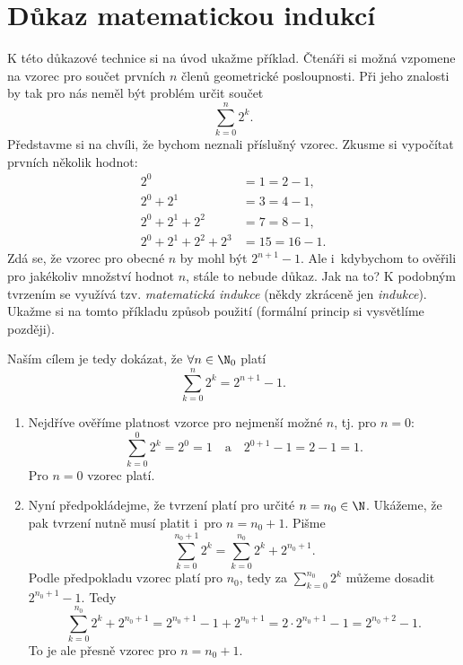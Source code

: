 \section{Důkaz matematickou indukcí}\label{sec:dukaz_indukci}
K této důkazové technice si na úvod ukažme příklad. Čtenáři si možná vzpomene na vzorec pro součet prvních $n$ členů geometrické posloupnosti. Při jeho znalosti by tak pro nás neměl být problém určit součet
\begin{equation*}
    \sum_{k=0}^{n}{2^k}.
\end{equation*}
Představme si na chvíli, že bychom neznali příslušný vzorec. Zkusme si vypočítat prvních několik hodnot:
\begin{align*}
    2^0&=1=2-1,\\
    2^0+2^1&=3=4-1,\\
    2^0+2^1+2^2&=7=8-1,\\
    2^0+2^1+2^2+2^3&=15=16-1.
\end{align*}
Zdá se, že vzorec pro obecné $n$ by mohl být $2^{n+1}-1$. Ale i~kdybychom to ověřili pro jakékoliv množství hodnot $n$, stále to nebude důkaz. Jak na to? K podobným tvrzením se využívá tzv. \emph{matematická indukce} (někdy zkráceně jen \emph{indukce}). Ukažme si na tomto příkladu způsob použití (formální princip si vysvětlíme později).\par
Naším cílem je tedy dokázat, že $\forall n\in\N_0$ platí
\begin{equation*}
    \sum_{k=0}^{n}{2^k}=2^{n+1}-1.
\end{equation*}
\begin{enumerate}[label=(\roman*)]
    \item\label{item:zaklad_indukce} Nejdříve ověříme platnost vzorce pro nejmenší možné $n$, tj. pro $n=0$:
    \begin{equation*}
        \sum_{k=0}^{0}{2^k}=2^0=1\quad\text{a}\quad2^{0+1}-1=2-1=1.
    \end{equation*}
    Pro $n=0$ vzorec platí.
    \item\label{item:indukcni_krok} Nyní předpokládejme, že tvrzení platí pro určité $n=n_0\in\N$. Ukážeme, že pak tvrzení nutně musí platit i~pro $n=n_0+1$. Pišme
    \begin{equation*}
        \sum_{k=0}^{n_0+1}{2^k}=\sum_{k=0}^{n_0}{2^k}+2^{n_0+1}.
    \end{equation*}
    Podle předpokladu vzorec platí pro $n_0$, tedy za $\sum_{k=0}^{n_0}{2^k}$ můžeme dosadit $2^{n_0+1}-1$. Tedy
    \begin{equation*}
        \sum_{k=0}^{n_0}{2^k}+2^{n_0+1}=2^{n_0+1}-1+2^{n_0+1}=2\cdot 2^{n_0+1}-1=2^{n_0+2}-1.
    \end{equation*}
    To je ale přesně vzorec pro $n=n_0+1$.
\end{enumerate}
